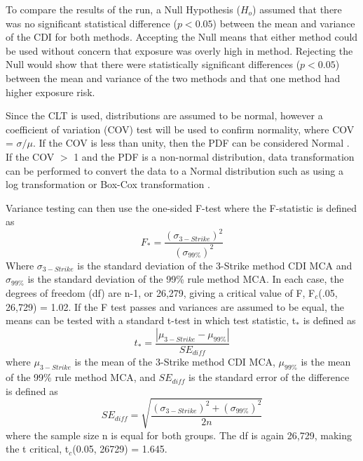 To compare the results of the run, a Null Hypothesis ($H_{o}$) assumed that there was no significant statistical difference ($p<0.05$) between the mean and variance of the CDI for both methods. Accepting the Null means that either method could be used without concern that exposure was overly high in method. Rejecting the Null would show that there were statistically significant differences ($p<0.05$) between the mean and variance of the two methods and that one method had higher exposure risk. 

Since the CLT is used, distributions are assumed to be normal, however a coefficient of variation (COV) test will be used to confirm normality, where COV = $\sigma/\mu$. If the COV is less than unity, then the PDF can be considered Normal \citep{Abdi2010}.  If the COV $>$ 1 and the PDF is a non-normal distribution, data transformation can be performed to convert the data to a Normal distribution such as using a log transformation or Box-Cox transformation \citep{Osborne2010}.

Variance testing can then use the one-sided F-test where the F-statistic is defined as
%
\begin{equation}
\label{eq6:ftest}
F_{*} = \frac{(\sigma_{3-Strike})^{2}}{(\sigma_{99\%})^{2}}
\end{equation}
%
Where $\sigma_{3-Strike}$ is the standard deviation of the 3-Strike method CDI MCA and $\sigma_{99\%}$ is the standard deviation of the 99\% rule method MCA. In each case, the degrees of freedom (df) are n-1, or 26,279, giving a critical value of F, F$_{c}$(.05, 26,729) = 1.02. If the F test passes and variances are assumed to be equal, the means can be tested with a standard t-test in which test statistic, t$_{*}$ is defined as
%
\begin{equation}
\label{eq7:t-test}
t_{*} = \frac{\left | \mu_{3-Strike}-\mu_{99\%} \right |}{SE_{diff}}
\end{equation}
%
\noindent
where $\mu_{3-Strike}$ is the mean of the 3-Strike method CDI MCA, $\mu_{99\%}$ is the mean of the 99\% rule method MCA, and $SE_{diff}$ is the standard error of the difference is defined as
%
\begin{equation}
\label{eq8:SEdiff}
SE_{diff} = \sqrt{\frac{(\sigma_{3-Strike})^{2}+(\sigma_{99\%})^{2}}{2n}}
\end{equation}
%
\noindent
where the sample size n is equal for both groups. The df is again 26,729, making the t critical, t$_{c}$(0.05, 26729) = 1.645.

